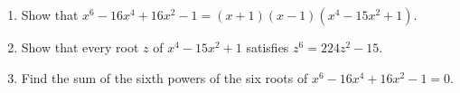\begin{enumerate}
\item[(a)] Show that $x^6-16x^4+16x^2-1=(x+1)(x-1)\left(x^4-15x^2+1\right)$.
\item[(b)] Show that every root $z$ of $x^4-15x^2+1$ satisfies $z^6=224z^2-15$.
\item[(c)] Find the sum of the sixth powers of the six roots of $x^6-16x^4+16x^2-1=0$.
\end{enumerate}

